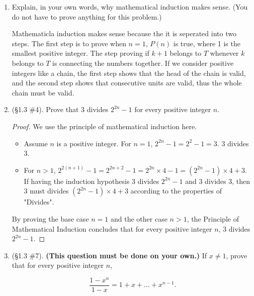 \documentclass[11pt,a4paper]{article}
\begin{document}
\begin{enumerate}
	\item Explain, in your own words, why mathematical induction makes sense. (You do not have to prove anything for this problem.)

	Mathematicla induction makes sense because the it is seperated into two steps. The first step is to prove when $n = 1$, $P(n)$ is true, where 1 is the smallest positive integer. The step proving if \(k + 1\) belongs to $T$ whenever $k$ belongs to $T$ is connecting the numbers together. If we consider positive integers like a chain, the first step shows that the head of the chain is valid, and the second step shows that consecutive units are valid, thus the whole chain must be valid.


	\item (\S 1.3 \#4). Prove that \(3\) divides \(2^{2n}-1\) for every positive integer \(n\).

	\begin{proof} We use the principle of mathematical induction here.\\
		\begin{itemize}
			\item Assume $n$ is a positive integer. For $n=1$, $2^{2n}-1 = 2^2-1 = 3$. 3 divides 3.
			\item For $n>1$, $2^{2(n+1)}-1 = 2^{2n+2}-1 = 2^{2n}\times 4-1 = (2^{2n}-1) \times 4 + 3$. If having the induction hypothesis 3 divides $2^{2n}-1$ and 3 divides 3, then 3 must divides $(2^{2n}-1) \times 4 + 3$ according to the properties of "Divides".
		\end{itemize}
		By proving the base case $n=1$ and the other case $n>1$, the Principle of Mathematical Induction concludes that for every positive integer $n$, 3 divides $2^{2n}-1$.
	\end{proof}


	\item (\S 1.3 \#7). \textbf{(This question must be done on your own.)} If \(x \ne 1 \), prove that for every positive integer \(n\),

	\[ \frac{1-x^{n}}{1-x} = 1 + x + \ldots + x^{n-1}. \]


\end{enumerate}
\end{document}
